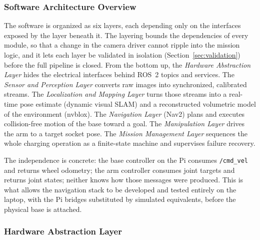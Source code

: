\subsubsection{Software Architecture Overview}\label{sec:overview}

The software is organized as six layers, each depending only on the interfaces exposed by the layer beneath it. The layering bounds the dependencies of every module, so that a change in the camera driver cannot ripple into the mission logic, and it lets each layer be validated in isolation (Section~\ref{sec:validation}) before the full pipeline is closed. From the bottom up, the \emph{Hardware Abstraction Layer} hides the electrical interfaces behind ROS~2 topics and services. The \emph{Sensor and Perception Layer} converts raw images into synchronized, calibrated streams. The \emph{Localization and Mapping Layer} turns those streams into a real-time pose estimate (dynamic visual SLAM) and a reconstructed volumetric model of the environment (nvblox). The \emph{Navigation Layer} (Nav2) plans and executes collision-free motion of the base toward a goal. The \emph{Manipulation Layer} drives the arm to a target socket pose. The \emph{Mission Management Layer} sequences the whole charging operation as a finite-state machine and supervises failure recovery.

The independence is concrete: the base controller on the Pi consumes \texttt{/cmd\_vel} and returns wheel odometry; the arm controller consumes joint targets and returns joint states; neither knows how those messages were produced. This is what allows the navigation stack to be developed and tested entirely on the laptop, with the Pi bridges substituted by simulated equivalents, before the physical base is attached.

\subsubsection{Hardware Abstraction Layer}\label{sec:hal}

